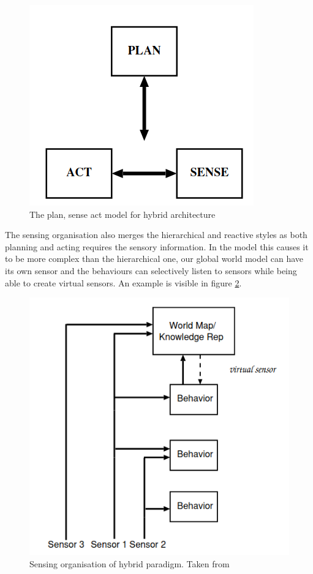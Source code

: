 \documentclass{article}
\newcommand\tab[1][1cm]{\hspace*{#1}}
\begin{document}
\begin{figure}[ht]
    \centering
    \includegraphics[scale=0.5]{img/PSA-Hybrid.png}
    \caption{The plan, sense act model for hybrid architecture}
    \label{HybirdPSA}
\end{figure}
\tab The sensing organisation also merges the hierarchical and reactive styles as both planning and
acting requires the sensory
information. In the model this causes it to be more complex than the hierarchical one, our global world model can have its
own sensor and the behaviours can selectively listen to sensors while being able to create virtual sensors.
An example is visible in figure \ref{sOrg}.
\begin{figure}[ht]
    \centering
    \includegraphics[scale=0.5]{img/sensing-organisation.png}
    \caption{Sensing organisation of hybrid paradigm. Taken from \cite{IntroToAI}}
    \label{sOrg}
\end{figure}
\newpage
\end{document}
